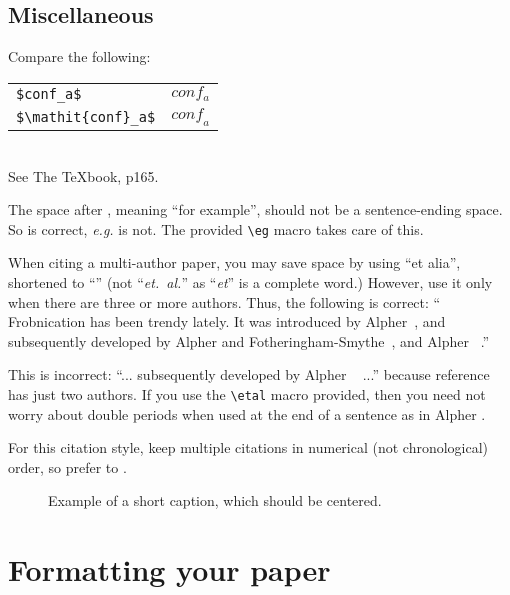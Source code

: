 \documentclass[10pt,twocolumn,letterpaper]{article}
\begin{document}
\subsection{Miscellaneous}

\noindent
Compare the following:\\
\begin{tabular}{ll}
 \verb'$conf_a$' &  $conf_a$ \\
 \verb'$\mathit{conf}_a$' & $\mathit{conf}_a$
\end{tabular}\\
See The \TeX book, p165.

The space after \eg, meaning ``for example'', should not be a
sentence-ending space. So \eg is correct, {\em e.g.} is not.  The provided
\verb'\eg' macro takes care of this.

When citing a multi-author paper, you may save space by using ``et alia'',
shortened to ``\etal'' (not ``{\em et.\ al.}'' as ``{\em et}'' is a complete word.)
However, use it only when there are three or more authors.  Thus, the
following is correct: ``
   Frobnication has been trendy lately.
   It was introduced by Alpher~\cite{Alpher02}, and subsequently developed by
   Alpher and Fotheringham-Smythe~\cite{Alpher03}, and Alpher \etal~\cite{Alpher04}.''

This is incorrect: ``... subsequently developed by Alpher \etal~\cite{Alpher03} ...''
because reference~\cite{Alpher03} has just two authors.  If you use the
\verb'\etal' macro provided, then you need not worry about double periods
when used at the end of a sentence as in Alpher \etal.

For this citation style, keep multiple citations in numerical (not
chronological) order, so prefer \cite{Alpher03,Alpher02,Authors06} to
\cite{Alpher02,Alpher03,Authors06}.


\begin{figure*}
\begin{center}
\fbox{\rule{0pt}{2in} \rule{.9\linewidth}{0pt}}
\end{center}
   \caption{Example of a short caption, which should be centered.}
\label{fig:short}
\end{figure*}

\section{Formatting your paper}
\end{document}
